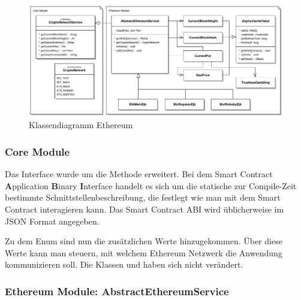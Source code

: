 \begin{figure}[H]
\centering
\includegraphics[width=1\linewidth]{Figures/umsetzung_eth/eth_business_logic1}
\decoRule
\caption{Klassendiagramm Ethereum}
\label{fig:eth_business_logic1}
\end{figure}

\subsubsection{Core Module}
Das  Interface wurde um die Methode  erweitert. Bei dem  Smart Contract \textbf{A}pplication \textbf{B}inary \textbf{I}nterface handelt es sich um die statische zur Compile-Zeit bestimmte Schnittstellenbeschreibung, die festlegt wie man mit dem Smart Contract interagieren kann. Das Smart Contract ABI wird üblicherweise im JSON Format angegeben.

Zu dem  Enum sind nun die zusätzlichen Werte  hinzugekommen. Über diese Werte kann man steuern, mit welchem Ethereum Netzwerk die Anwendung kommunizieren soll. 
Die Klassen  und  haben sich nicht verändert.
\subsubsection{Ethereum Module: AbstractEthereumService}

